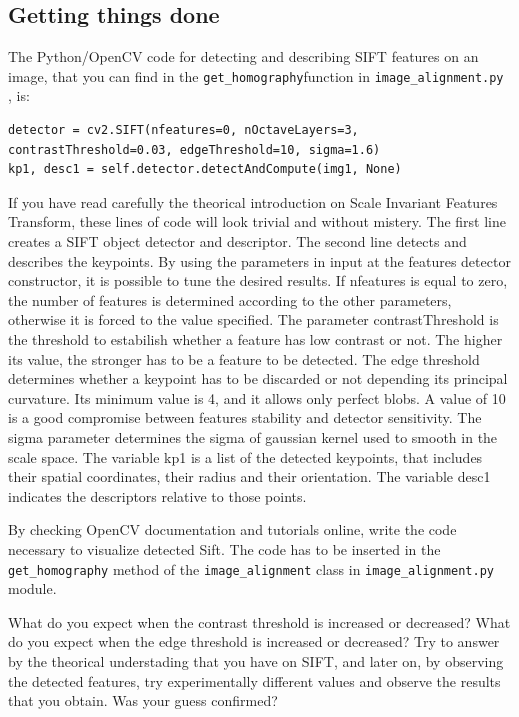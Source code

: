 \documentclass[aps,letterpaper,10pt]{revtex4}
\begin{document}
\subsection{Getting things done}
The Python/OpenCV code for detecting and describing SIFT features on an image, that you can find in the \verb|get_homography|function in \verb|image_alignment.py| , is:  
\begin{lstlisting}
detector = cv2.SIFT(nfeatures=0, nOctaveLayers=3, contrastThreshold=0.03, edgeThreshold=10, sigma=1.6)
kp1, desc1 = self.detector.detectAndCompute(img1, None)
\end{lstlisting}
If you have read carefully the theorical introduction on Scale Invariant Features Transform, these lines of code will look trivial and without mistery. The first line creates a SIFT object detector and descriptor. The second line detects and describes the keypoints. By using the parameters in input at the features detector constructor, it is possible to tune the desired results. If nfeatures is equal to zero, the number of features is determined according to the other parameters, otherwise it is forced to the value specified. The parameter contrastThreshold is the threshold to estabilish whether a feature has low contrast or not. The higher its value, the stronger has to be a feature to be detected. The edge threshold determines whether a keypoint has to be discarded or not depending its principal curvature. Its minimum value is 4, and it allows only perfect blobs. A value of 10 is a good compromise between features stability and detector sensitivity. The sigma parameter determines the sigma of gaussian kernel used to smooth in the scale space. The variable kp1 is a list of the detected keypoints, that includes their spatial coordinates, their radius and their orientation. The variable desc1 indicates the descriptors relative to those points.

By checking OpenCV documentation and tutorials online, write the code necessary to visualize detected Sift. The code has to be inserted in the \verb|get_homography| method of the \verb|image_alignment| class in \verb|image_alignment.py| module.

What do you expect when the contrast threshold is increased or decreased? What do you expect when the edge threshold is increased or decreased? Try to answer by the theorical understading that you have on SIFT, and later on, by observing the detected features, try experimentally different values and observe the results that you obtain. Was your guess confirmed? 
\end{document}
